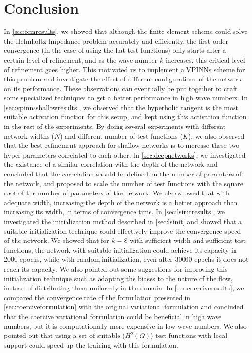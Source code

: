 \section{Conclusion}\label{sec:conclusion}
In \autoref{sec:femresults}, we showed that although the finite element scheme could solve the Helmholtz Impedance problem accurately and efficiently, the first-order convergence (in the case of using the hat test functions) only starts after a certain level of refinement, and as the wave number $k$ increases, this critical level of refinement goes higher. This motivated us to implement a VPINNs scheme for this problem and investigate the effect of different configurations of the network on its performance. These observations can eventually be put together to craft some specialized techniques to get a better performance in high wave numbers. In \autoref{sec:vpinnsshallowresults}, we observed that the hyperbolic tangent is the most suitable activation function for this setup, and kept using this activation function in the rest of the experiments. By doing several experiments with different network widths ($N$) and different number of test functions ($K$), we also observed that the best refinement approach for shallow networks is to increase these two hyper-parameters correlated to each other. In \autoref{sec:deepnetworks}, we investigated the existance of a similar correlation with the depth of the network and concluded that the correlation should be defined on the number of paramters of the network, and proposed to scale the number of test functions with the square root of the number of parameters of the network. We also showed that with adequate width, increasing the depth of the network is a better approach than increasing its width, in terms of convergence time. In \autoref{sec:lsinitresults}, we investigated the initialization method described in \autoref{sec:lsinit} and showed that a suitable initialization technique could effectively improve the convergence speed of the network. We showed that for $k=8$ with sufficient width and sufficient test functions, the network with suitable initialization could achieve its capacity in 2000 epochs, while with random initialization, even after 30000 epochs it does not reach its capacity. We also pointed out some suggestions for improving this initialization technique such as adapting the biases to the nature of the flow, instead of distributing them uniformly in the domain. In \autoref{sec:coerciveresults}, we compared the convergence rate of the formulation presented in \autoref{sec:coerciveformulation} with the original variational formulation and concluded that the coercive variational formulation could be beneficial in high wave numbers, but it is computationally more expensive in low wave numbers. We also pointed out that using a set of suitable ($H^2(\Omega)$) test functions with local support could speed up the training with this formulation.

